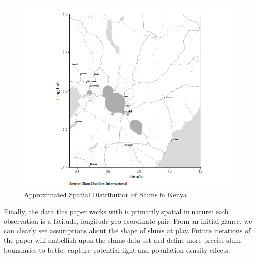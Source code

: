 \begin{figure}
    \centering
    \includegraphics[scale = 0.6]{Graphics/Approximated Spatial Distribution of Slums in Kenya.png}
    \caption{Approximated Spatial Distribution of Slums in Kenya}
    \label{fig:slumMap}
\end{figure}

Finally, the data this paper works with is primarily spatial in nature: each observation is a latitude, longitude geo-coordinate pair. From an initial glance, we can clearly see assumptions about the shape of slums at play. Future iterations of the paper will embellish upon the slums data set and define more precise slum boundaries to better capture potential light and population density effects.


